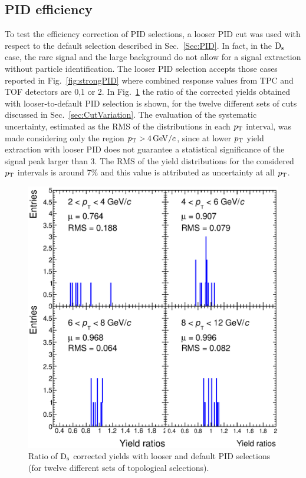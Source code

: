\subsection{PID efficiency}
\label{sec:PIDsystPP}
To test the efficiency correction of PID selections, a looser PID cut
was used with respect to the default selection described in Sec.~\ref{Sec:PID}. 
In fact, in the ${\rm D_s}$ case, the rare signal and the large background 
do not allow for a signal extraction without 
particle identification. The looser PID selection accepts those cases 
reported in Fig.~\ref{fig:strongPID} where combined response values from TPC and TOF 
detectors are 0,1 or 2.
In Fig.~\ref{fig:rmsPID} the ratio
of the corrected yields obtained with looser-to-default PID selection is shown, 
for the twelve different sets of cuts discussed in Sec.~\ref{sec:CutVariation}.
The evaluation of the systematic uncertainty, estimated as the RMS of the distributions in each $p_{\rm T}$ 
interval, was made considering only the region $p_{\rm T} > 4 \, \mathrm{GeV}/c$, since at lower $p_{\rm T}$ 
yield extraction with looser PID does not guarantee a statistical significance
of the signal peak larger than 3. The RMS of the yield distributions for the considered
$p_{\rm T}$ intervals is around 7\% and this value is attributed as uncertainty at all $p_{\rm T}$.

\begin{figure}[!htb]
\begin{center}
 \includegraphics[width=.7\textwidth]{FigCap4/PIDrms4x4}
\caption{Ratio of ${\rm D_s}$ corrected yields with looser and default PID selections (for twelve different sets of
topological selections).}
\label{fig:rmsPID}
\end{center}
\end{figure}

